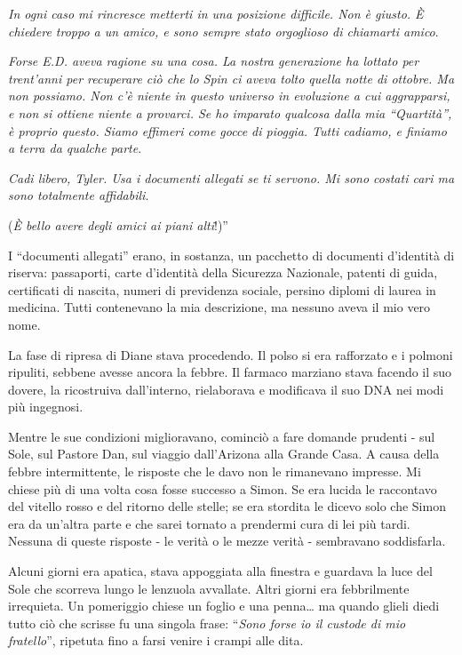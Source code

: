 \emph{In ogni caso mi rincresce metterti in una posizione difficile. Non
	è giusto. È chiedere troppo a un amico, e sono sempre stato orgoglioso
	di chiamarti amico}.

\emph{Forse E.D. aveva ragione su una cosa. La nostra generazione ha
	lottato per trent'anni per recuperare ciò che lo Spin ci aveva tolto
	quella notte di ottobre. Ma non possiamo. Non c'è niente in questo
	universo in evoluzione a cui aggrapparsi, e non si ottiene niente a
	provarci. Se ho imparato qualcosa dalla mia ``Quartità'', è proprio
	questo. Siamo effimeri come gocce di pioggia. Tutti cadiamo, e finiamo a
	terra da qualche parte}.

\emph{Cadi libero, Tyler. Usa i documenti allegati se ti servono. Mi
	sono costati cari ma sono totalmente affidabili}.

(\emph{È bello avere degli amici ai piani alti}!)''

I ``documenti allegati'' erano, in sostanza, un pacchetto di documenti
d'identità di riserva: passaporti, carte d'identità della Sicurezza
Nazionale, patenti di guida, certificati di nascita, numeri di
previdenza sociale, persino diplomi di laurea in medicina. Tutti
contenevano la mia descrizione, ma nessuno aveva il mio vero nome.

\separatorefiori

La fase di ripresa di Diane stava procedendo. Il polso si era rafforzato
e i polmoni ripuliti, sebbene avesse ancora la febbre. Il farmaco
marziano stava facendo il suo dovere, la ricostruiva dall'interno,
rielaborava e modificava il suo DNA nei modi più ingegnosi.

Mentre le sue condizioni miglioravano, cominciò a fare domande prudenti
- sul Sole, sul Pastore Dan, sul viaggio dall'Arizona alla Grande Casa.
A causa della febbre intermittente, le risposte che le davo non le
rimanevano impresse. Mi chiese più di una volta cosa fosse successo a
Simon. Se era lucida le raccontavo del vitello rosso e del ritorno delle
stelle; se era stordita le dicevo solo che Simon era da un'altra parte e
che sarei tornato a prendermi cura di lei più tardi. Nessuna di queste
risposte - le verità o le mezze verità - sembravano soddisfarla.

Alcuni giorni era apatica, stava appoggiata alla finestra e guardava la
luce del Sole che scorreva lungo le lenzuola avvallate. Altri giorni era
febbrilmente irrequieta. Un pomeriggio chiese un foglio e una
penna\ldots{} ma quando glieli diedi tutto ciò che scrisse fu una
singola frase: ``\emph{Sono forse io il custode di mio fratello}'',
ripetuta fino a farsi venire i crampi alle dita.

